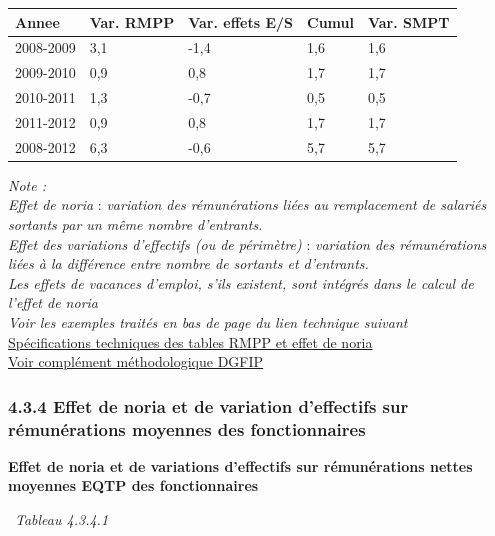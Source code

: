 \begin{longtable}[]{@{}lllll@{}}
\toprule
Annee & Var. RMPP & Var. effets E/S & Cumul & Var. SMPT\tabularnewline
\midrule
\endhead
2008-2009 & 3,1 & -1,4 & 1,6 & 1,6\tabularnewline
2009-2010 & 0,9 & 0,8 & 1,7 & 1,7\tabularnewline
2010-2011 & 1,3 & -0,7 & 0,5 & 0,5\tabularnewline
2011-2012 & 0,9 & 0,8 & 1,7 & 1,7\tabularnewline
2008-2012 & 6,3 & -0,6 & 5,7 & 5,7\tabularnewline
\bottomrule
\end{longtable}

\emph{Note :}\\
\emph{Effet de noria} : \emph{variation des rémunérations liées au
remplacement de salariés sortants par un même nombre d'entrants.}\\
\emph{Effet des variations d'effectifs (ou de périmètre)} :
\emph{variation des rémunérations liées à la différence entre nombre de
sortants et d'entrants.}\\
\emph{Les effets de vacances d'emploi, s'ils existent, sont intégrés
dans le calcul de l'effet de noria}\\
\emph{Voir les exemples traités en bas de page du lien technique
suivant}\\
\href{../Docs/Notices/noria.html}{Spécifications techniques des tables RMPP
et effet de noria}\\
\href{../Docs/Notices/GVT\%20et\%20noria.pdf}{Voir complément
méthodologique DGFIP}

\hypertarget{effet-de-noria-et-de-variation-deffectifs-sur-remunerations-moyennes-des-fonctionnaires}{%
\subsubsection{4.3.4 Effet de noria et de variation d'effectifs sur
rémunérations moyennes des
fonctionnaires}\label{effet-de-noria-et-de-variation-deffectifs-sur-remunerations-moyennes-des-fonctionnaires}}

\textbf{Effet de noria et de variations d'effectifs sur rémunérations
nettes moyennes EQTP des fonctionnaires}

~\emph{Tableau 4.3.4.1}

